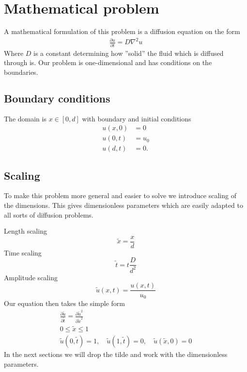 \documentclass[11pt,a4paper,final]{article}
\numberwithin{equation}{section}
\begin{document}
\section{Mathematical problem}
A mathematical formulation of this problem is a diffusion equation on the form
\begin{gather}
\frac{\partial u}{\partial t} = D\nabla^2u
\end{gather}
Where $D$ is a constant determining how ''solid'' the fluid which is 
diffused through is. Our problem is one-dimensional and has conditions on 
the boundaries.
\subsection{Boundary conditions}
The domain is $x \in [0, d]$ with boundary and initial conditions
\begin{align}
u(x,0) &= 0\\
u(0,t) &= u_0\\
u(d,t) &= 0.
\end{align}

\subsection{Scaling}
To make this problem more general and easier to solve we introduce 
scaling of the dimensions. This gives dimensionless parameters which 
are easily adapted to all sorts of diffusion problems.

Length scaling
\begin{equation}
\tilde{x} = \frac{x}{d}
\end{equation}
Time scaling
\begin{equation}
\tilde{t} = t\frac{D}{d^2}
\end{equation}
Amplitude scaling
\begin{equation}
\tilde{u}(x,t) = \frac{u(x,t)}{u_0}
\end{equation}
Our equation then takes the simple form
\begin{gather}
\frac{\partial \tilde{u}}{\partial \tilde{t}}
= \frac{\partial \tilde{u}^2}{\partial \tilde{x}^2}\\
0 \le \tilde{x} \le 1\\
\tilde{u}(0,\tilde{t})
= 1, \quad \tilde{u}(1,\tilde{t}) = 0, \quad \tilde{u}(\tilde{x}, 0 ) = 0
\end{gather}
In the next sections we will drop the tilde and work with the 
dimensionless parameters.
\end{document}
